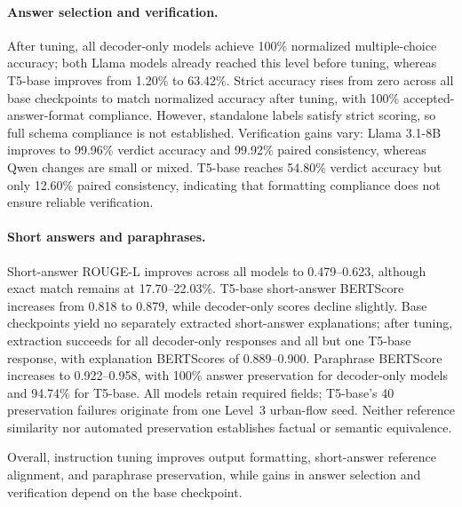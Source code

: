 \documentclass[a4paper,fleqn]{cas-sc}
\begin{document}
\paragraph{Answer selection and verification.}
After tuning, all decoder-only models achieve 100\% normalized multiple-choice accuracy; both Llama models already reached this level before tuning, whereas T5-base improves from 1.20\% to 63.42\%. Strict accuracy rises from zero across all base checkpoints to match normalized accuracy after tuning, with 100\% accepted-answer-format compliance. However, standalone labels satisfy strict scoring, so full schema compliance is not established. Verification gains vary: Llama 3.1-8B improves to 99.96\% verdict accuracy and 99.92\% paired consistency, whereas Qwen changes are small or mixed. T5-base reaches 54.80\% verdict accuracy but only 12.60\% paired consistency, indicating that formatting compliance does not ensure reliable verification.

\paragraph{Short answers and paraphrases.}
Short-answer ROUGE-L improves across all models to 0.479--0.623, although exact match remains at 17.70--22.03\%. T5-base short-answer BERTScore increases from 0.818 to 0.879, while decoder-only scores decline slightly. Base checkpoints yield no separately extracted short-answer explanations; after tuning, extraction succeeds for all decoder-only responses and all but one T5-base response, with explanation BERTScores of 0.889--0.900. Paraphrase BERTScore increases to 0.922--0.958, with 100\% answer preservation for decoder-only models and 94.74\% for T5-base. All models retain required fields; T5-base's 40 preservation failures originate from one Level~3 urban-flow seed. Neither reference similarity nor automated preservation establishes factual or semantic equivalence.

Overall, instruction tuning improves output formatting, short-answer reference alignment, and paraphrase preservation, while gains in answer selection and verification depend on the base checkpoint.


\end{document}
